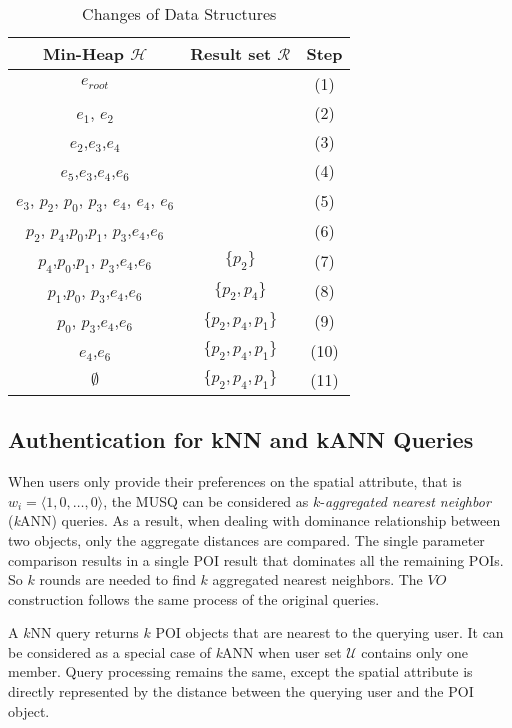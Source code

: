 \documentclass[10pt, conference, compsocconf]{IEEEtran}
\begin{document}
\begin{table}
	\begin{center}\scriptsize
		\begin{tabular}{ c | c | c }
			\hline
			Min-Heap $\mathcal{H}$ & Result set $\mathcal{R}$ & Step  \\
			\hline
			$e_{root}$ & & (1)\\
			$e_1$, $e_2$ & & (2) \\
			$e_2$,$e_3$,$e_4$ & & (3) \\
			$e_5$,$e_3$,$e_4$,$e_6$ & & (4)\\
			$e_3$, $p_2$, $p_0$, $p_3$, $e_4$, $e_4$, $e_6$ & & (5)\\
			$p_2$, $p_4$,$p_0$,$p_1$, $p_3$,$e_4$,$e_6$ & & (6) \\
			$p_4$,$p_0$,$p_1$, $p_3$,$e_4$,$e_6$ & $\{p_2\}$ & (7) \\
		    $p_1$,$p_0$, $p_3$,$e_4$,$e_6$ & $\{p_2,p_4\}$ & (8) \\
		    $p_0$, $p_3$,$e_4$,$e_6$ & $\{p_2,p_4,p_1\}$ & (9) \\
			$e_4$,$e_6$ & $\{p_2,p_4,p_1\}$ & (10) \\
	     	$\emptyset$ & $\{p_2,p_4,p_1\}$ & (11) \\
			\hline
		\end{tabular}
	\end{center}
	\caption{Changes of Data Structures}\label{ds2}
\end{table}


\subsection{Authentication for kNN and kANN Queries}

When users only provide their preferences on the spatial attribute, that is $w_{i}=\langle 1,0,\ldots,0\rangle$, the MUSQ can be considered as $k$-\emph{aggregated nearest neighbor} (\emph{k}ANN) queries. As a result, when dealing with dominance relationship between two objects, only the aggregate distances are compared. The single parameter comparison results in a single POI result that dominates all the remaining POIs. So $k$ rounds are needed to find $k$ aggregated nearest neighbors. The $VO$ construction follows the same process of the original queries.

A $k$NN query returns $k$ POI objects that are nearest to the querying user. It can be considered as a special case of \emph{k}ANN when user set $\mathcal{U}$ contains only one member. Query processing remains the same, except the spatial attribute is directly represented by the distance between the querying user and the POI object.
\end{document}
